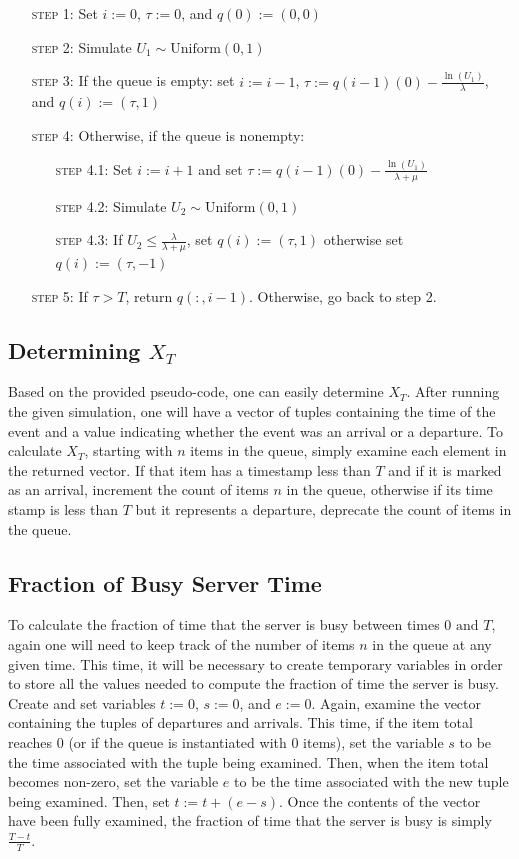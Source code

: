 \documentclass[11pt, oneside]{article}
\begin{document}
\begin{enumerate}[leftmargin=30pt,labelindent=65pt,itemindent=30pt]
\item[\textsc{step 1:}] Set $i:=0$, $\tau:=0$, and $q(0):=(0,0)$
\item[\textsc{step 2:}] Simulate $U_1 \sim \text{Uniform}(0,1)$
\item[\textsc{step 3:}] If the queue is empty: set $i:=i-1$, $\tau:=q(i-1)(0) - \frac{\ln(U_1)}{\lambda}$, and $q(i):=(\tau, 1)$
\item[\textsc{step 4:}] Otherwise, if the queue is nonempty:
\begin{enumerate}[leftmargin=25pt,labelindent=65pt,itemindent=25pt]
\item[\textsc{step 4.1:}] Set $i:=i+1$ and set $\tau:=q(i-1)(0) - \frac{\ln(U_1)}{\lambda + \mu}$
\item[\textsc{step 4.2:}] Simulate $U_2\sim\text{Uniform}(0,1)$
\item[\textsc{step 4.3:}] If $U_2 \leq \frac{\lambda}{\lambda+\mu}$, set $q(i):=(\tau, 1)$ otherwise set $q(i):=(\tau,-1)$
\end{enumerate}
\item[\textsc{step 5:}] If $\tau > T$, return $q(:,i-1)$. Otherwise, go back to step 2.
\end{enumerate}

\subsection{Determining $X_T$}
Based on the provided pseudo-code, one can easily determine $X_T$. After running the given simulation, one will have a vector of tuples containing the time of the event and a value indicating whether the event was an arrival or a departure. To calculate $X_T$, starting with $n$ items in the queue, simply examine each element in the returned vector. If that item has a timestamp less than $T$ and if it is marked as an arrival, increment the count of items $n$ in the queue, otherwise if its time stamp is less than $T$ but it represents a departure, deprecate the count of items in the queue.

\subsection{Fraction of Busy Server Time}
To calculate the fraction of time that the server is busy between times $0 \text{ and } T$, again one will need to keep track of the number of items $n$ in the queue at any given time. This time, it will be necessary to create temporary variables in order to store all the values needed to compute the fraction of time the server is busy. Create and set variables $t:=0$, $s:=0$, and $e:=0$. Again, examine the vector containing the tuples of departures and arrivals. This time, if the item total reaches $0$ (or if the queue is instantiated with $0$ items), set the variable $s$ to be the time associated with the tuple being examined. Then, when the item total becomes non-zero, set the variable $e$ to be the time associated with the new tuple being examined. Then, set $t:=t+(e-s)$. Once the contents of the vector have been fully examined, the fraction of time that the server is busy is simply $\frac{T-t}{T}$.
\end{document}
